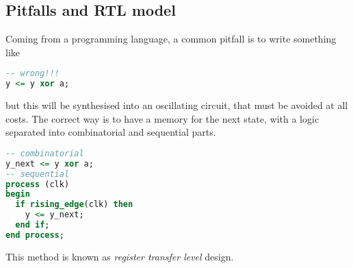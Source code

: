 \subsection{Pitfalls and RTL model}
Coming from a programming language, a common pitfall is to write something like
\begin{center}
  \begin{minipage}{.4\linewidth}
    \begin{lstlisting}[language=vhdl]
-- wrong!!!
y <= y xor a;
    \end{lstlisting}
  \end{minipage}
  \begin{minipage}{.4\linewidth}
    \centering
    \ttfamily
  \end{minipage}
\end{center}
but this will be synthesised into an oscillating circuit, that must be avoided
at all costs. The correct way is to have a memory for the next state, with a
logic separated into combinatorial and sequential parts.
\begin{lstlisting}[language=vhdl]
-- combinatorial
y_next <= y xor a;
-- sequential
process (clk)
begin
  if rising_edge(clk) then
    y <= y_next;
  end if;
end process;
\end{lstlisting}
This method is known as \emph{register transfer level} design.

